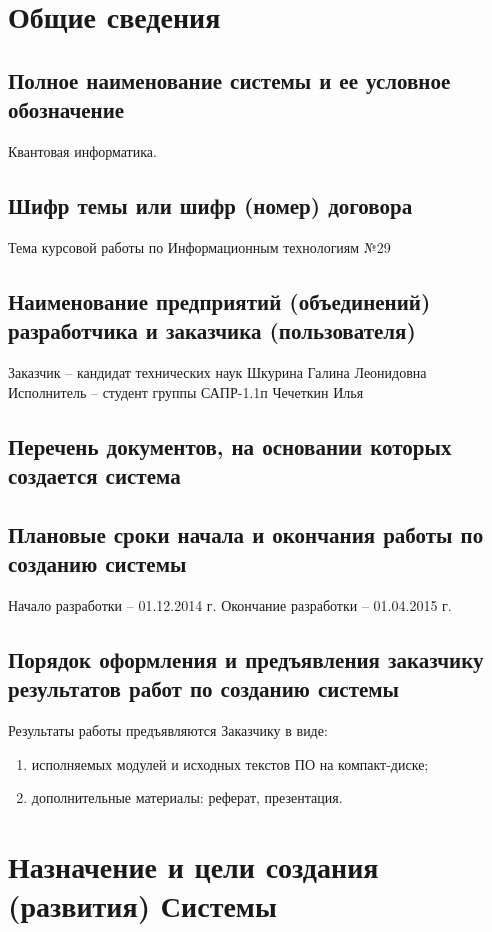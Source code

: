 \chapter{Общие сведения}
\section{Полное наименование системы и ее условное обозначение}
Квантовая информатика.

\section{Шифр темы или шифр (номер) договора}
Тема курсовой работы по Информационным технологиям №29

\section{Наименование предприятий (объединений) разработчика и заказчика
  (пользователя)}
Заказчик -- кандидат технических наук Шкурина Галина Леонидовна\\
Исполнитель -- студент группы САПР-1.1п Чечеткин Илья

\section{Перечень документов, на основании которых создается система}
\section{Плановые сроки начала и окончания работы по созданию системы}
Начало разработки -- 01.12.2014 г. Окончание разработки -- 01.04.2015 г.

\section{Порядок оформления и предъявления заказчику результатов работ по
  созданию системы}
Результаты работы предъявляются Заказчику в виде:
\begin{enumerate}
  \item исполняемых модулей и исходных текстов ПО на компакт-диске;
  \item дополнительные материалы: реферат, презентация.
\end{enumerate}

\chapter{Назначение и цели создания (развития) Системы}
